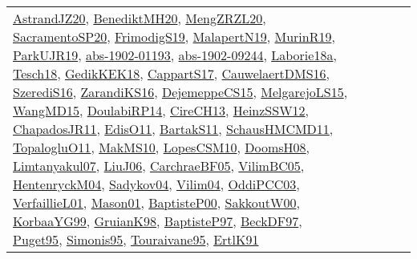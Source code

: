 {\begin{longtable}{lp{3cm}>{\raggedright}p{6cm}>{\raggedright}p{6cm}p{8cm}}
\href{articles/AstrandJZ20.pdf}{AstrandJZ20}\cite{AstrandJZ20}, \href{articles/BenediktMH20.pdf}{BenediktMH20}\cite{BenediktMH20}, \href{articles/MengZRZL20.pdf}{MengZRZL20}\cite{MengZRZL20}, \href{articles/SacramentoSP20.pdf}{SacramentoSP20}\cite{SacramentoSP20}, \href{papers/FrimodigS19.pdf}{FrimodigS19}\cite{FrimodigS19}, \href{papers/MalapertN19.pdf}{MalapertN19}\cite{MalapertN19}, \href{papers/MurinR19.pdf}{MurinR19}\cite{MurinR19}, \href{papers/ParkUJR19.pdf}{ParkUJR19}\cite{ParkUJR19}, \href{articles/abs-1902-01193.pdf}{abs-1902-01193}\cite{abs-1902-01193}, \href{articles/abs-1902-09244.pdf}{abs-1902-09244}\cite{abs-1902-09244}, \href{papers/Laborie18a.pdf}{Laborie18a}\cite{Laborie18a}, \href{papers/Tesch18.pdf}{Tesch18}\cite{Tesch18}, \href{articles/GedikKEK18.pdf}{GedikKEK18}\cite{GedikKEK18}, \href{papers/CappartS17.pdf}{CappartS17}\cite{CappartS17}, \href{papers/CauwelaertDMS16.pdf}{CauwelaertDMS16}\cite{CauwelaertDMS16}, \href{papers/SzerediS16.pdf}{SzerediS16}\cite{SzerediS16}, \href{articles/ZarandiKS16.pdf}{ZarandiKS16}\cite{ZarandiKS16}, \href{papers/DejemeppeCS15.pdf}{DejemeppeCS15}\cite{DejemeppeCS15}, \href{papers/MelgarejoLS15.pdf}{MelgarejoLS15}\cite{MelgarejoLS15}, \href{articles/WangMD15.pdf}{WangMD15}\cite{WangMD15}, \href{papers/DoulabiRP14.pdf}{DoulabiRP14}\cite{DoulabiRP14}, \href{papers/CireCH13.pdf}{CireCH13}\cite{CireCH13}, \href{articles/HeinzSSW12.pdf}{HeinzSSW12}\cite{HeinzSSW12}, \href{papers/ChapadosJR11.pdf}{ChapadosJR11}\cite{ChapadosJR11}, \href{papers/EdisO11.pdf}{EdisO11}\cite{EdisO11}, \href{articles/BartakS11.pdf}{BartakS11}\cite{BartakS11}, \href{articles/SchausHMCMD11.pdf}{SchausHMCMD11}\cite{SchausHMCMD11}, \href{articles/TopalogluO11.pdf}{TopalogluO11}\cite{TopalogluO11}, \href{papers/MakMS10.pdf}{MakMS10}\cite{MakMS10}, \href{articles/LopesCSM10.pdf}{LopesCSM10}\cite{LopesCSM10}, \href{papers/DoomsH08.pdf}{DoomsH08}\cite{DoomsH08}, \href{papers/Limtanyakul07.pdf}{Limtanyakul07}\cite{Limtanyakul07}, \href{papers/LiuJ06.pdf}{LiuJ06}\cite{LiuJ06}, \href{papers/CarchraeBF05.pdf}{CarchraeBF05}\cite{CarchraeBF05}, \href{articles/VilimBC05.pdf}{VilimBC05}\cite{VilimBC05}, \href{papers/HentenryckM04.pdf}{HentenryckM04}\cite{HentenryckM04}, \href{papers/Sadykov04.pdf}{Sadykov04}\cite{Sadykov04}, \href{papers/Vilim04.pdf}{Vilim04}\cite{Vilim04}, \href{papers/OddiPCC03.pdf}{OddiPCC03}\cite{OddiPCC03}, \href{papers/VerfaillieL01.pdf}{VerfaillieL01}\cite{VerfaillieL01}, \href{articles/Mason01.pdf}{Mason01}\cite{Mason01}, \href{articles/BaptisteP00.pdf}{BaptisteP00}\cite{BaptisteP00}, \href{articles/SakkoutW00.pdf}{SakkoutW00}\cite{SakkoutW00}, \href{papers/KorbaaYG99.pdf}{KorbaaYG99}\cite{KorbaaYG99}, \href{papers/GruianK98.pdf}{GruianK98}\cite{GruianK98}, \href{papers/BaptisteP97.pdf}{BaptisteP97}\cite{BaptisteP97}, \href{papers/BeckDF97.pdf}{BeckDF97}\cite{BeckDF97}, \href{papers/Puget95.pdf}{Puget95}\cite{Puget95}, \href{papers/Simonis95.pdf}{Simonis95}\cite{Simonis95}, \href{papers/Touraivane95.pdf}{Touraivane95}\cite{Touraivane95}, \href{papers/ErtlK91.pdf}{ErtlK91}\cite{ErtlK91}\\

\end{longtable}}
